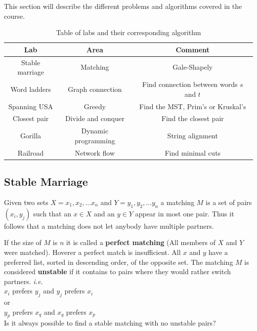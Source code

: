 \documentclass[12pt]{article} %
\begin{document}
This section will describe the different problems and algorithms covered in the course.

\begin{table}[h!]
\centering
\begin{tabular}{| c | c | c |}
    \hline
    Lab & Area & Comment \\
    \hline \hline
    Stable marriage & Matching & Gale-Shapely \\
    Word ladders & Graph connection & Find connection between words $s$ and $t$ \\
    Spanning USA & Greedy & Find the MST, Prim's or Kruskal's \\
    Closest pair & Divide and conquer & Find the closest pair \\
    Gorilla & Dynamic programming & String alignment \\
    Railroad & Network flow & Find minimal cuts \\
    \hline
\end{tabular}
\caption{Table of labs and their corresponding algorithm}
\label{table: 1}
\end{table}

\subsection{Stable Marriage} %
Given two sets $X = {x_{1}, x_{2}, \dots x_{n}}$ and $Y = {y_{1}, y_{2}, \dots y_{n}}$ a matching $M$ is a set of pairs $(x_{i}, y_{j})$ such that an $x \in X$ and an $y \in Y$ appear in most one pair. Thus it follows that a matching does not let anybody have multiple partners.

\par If the size of $M$ is $n$ it is called a \textbf{perfect matching} (All members of $X$ and $Y$ were matched). Hoverer a perfect match is insufficient. All $x$ and $y$ have a preferred list, sorted in descending order, of the opposite set. The matching $M$ is considered \textbf{unstable} if it contains to pairs where they would rather switch partners. \textit{i.e.}\\
$x_{i}$ prefers $y_{j}$ and $y_{j}$ prefers $x_{i}$ \\
or \\
$y_{p}$ prefers $x_{q}$ and $x_{q}$ prefers $x_{p}$ \\
Is it always possible to find a stable matching with no unstable pairs?
\end{document}
